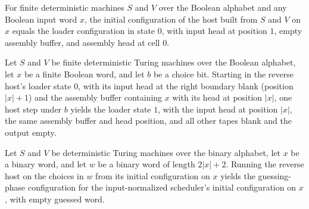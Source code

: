 \begin{lemma}
\label{Complexity.b2_initial}
\leanok
{}
For finite deterministic machines $S$ and $V$ over the Boolean alphabet and any Boolean
input word $x$, the initial configuration of the host built from $S$ and $V$ on $x$
equals the loader configuration in state $0$, with input head at position $1$, empty
assembly buffer, and assembly head at cell $0$.
\end{lemma}

\begin{lemma}
\label{Complexity.b2_copy_done}
\leanok
{}
Let $S$ and $V$ be finite deterministic Turing machines over the Boolean alphabet, let
$x$ be a finite Boolean word, and let $b$ be a choice bit. Starting in the reverse
host’s loader state $0$, with its input head at the right boundary blank (position
$|x|+1$) and the assembly buffer containing $x$ with its head at position $|x|$, one
host step under $b$ yields the loader state $1$, with the input head at position $|x|$,
the same assembly buffer and head position, and all other tapes blank and the output
empty.
\end{lemma}

\begin{lemma}
\label{Complexity.b2_start}
\leanok
{}
Let $S$ and $V$ be deterministic Turing machines over the binary alphabet, let $x$ be a
binary word, and let $w$ be a binary word of length $2|x|+2$. Running the reverse host
on the choices in $w$ from its initial configuration on $x$ yields the guessing-phase
configuration for the input-normalized scheduler's initial configuration on $x$, with
empty guessed word.
\end{lemma}

